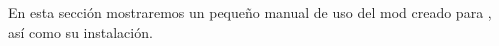 En esta sección mostraremos un pequeño manual de uso del mod creado para \cities, así como su instalación.
